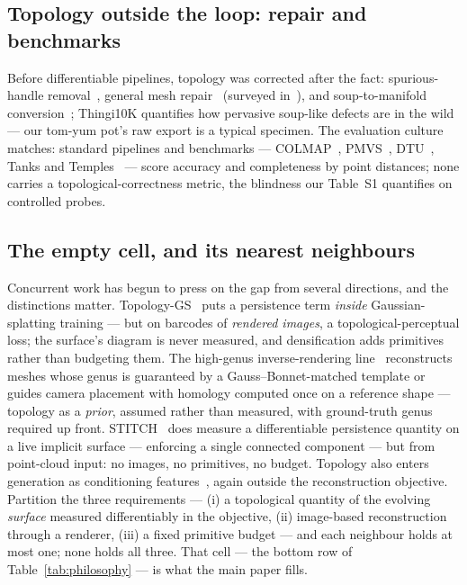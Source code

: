 \subsection{Topology outside the loop: repair and benchmarks}
Before differentiable pipelines, topology was corrected after the fact:
spurious-handle removal~\citep{guskov2001topological,wood2004excess},
general mesh repair~\citep{attene2010repair,ju2004repair,sharf2007topologyaware}
(surveyed in~\citep{attene2013repairing}), and soup-to-manifold
conversion~\citep{huang2020manifoldplus,hu2018tetwild}; Thingi10K
quantifies how pervasive soup-like defects are in the
wild~\citep{zhou2016thingi10k} --- our tom-yum pot's raw export is a
typical specimen. The evaluation culture matches: standard pipelines
and benchmarks --- COLMAP~\citep{schonberger2016sfm,schonberger2016pixelwise},
PMVS~\citep{furukawa2010pmvs}, DTU~\citep{jensen2014dtu}, Tanks and
Temples~\citep{knapitsch2017tanks} --- score accuracy and completeness
by point distances; none carries a topological-correctness metric, the
blindness our Table~S1 quantifies on controlled probes.

\subsection{The empty cell, and its nearest neighbours}
Concurrent work has begun to press on the gap from several directions,
and the distinctions matter. Topology-GS~\citep{shen2025topologygs}
puts a persistence term \emph{inside} Gaussian-splatting training ---
but on barcodes of \emph{rendered images}, a topological-perceptual
loss; the surface's diagram is never measured, and densification adds
primitives rather than budgeting them. The high-genus inverse-rendering
line~\citep{gao2025genus,gao2026homology} reconstructs meshes whose
genus is guaranteed by a Gauss--Bonnet-matched template or guides
camera placement with homology computed once on a reference shape ---
topology as a \emph{prior}, assumed rather than measured, with
ground-truth genus required up front.
STITCH~\citep{jignasu2024stitch} does measure a differentiable
persistence quantity on a live implicit surface --- enforcing a single
connected component --- but from point-cloud input: no images, no
primitives, no budget. Topology also enters generation as conditioning
features~\citep{hu2024topodiffusion}, again outside the reconstruction
objective. Partition the three requirements --- (i) a topological
quantity of the evolving \emph{surface} measured differentiably in the
objective, (ii) image-based reconstruction through a renderer, (iii) a
fixed primitive budget --- and each neighbour holds at most one; none
holds all three. That cell --- the bottom row of
Table~\ref{tab:philosophy} --- is what the main paper fills.

